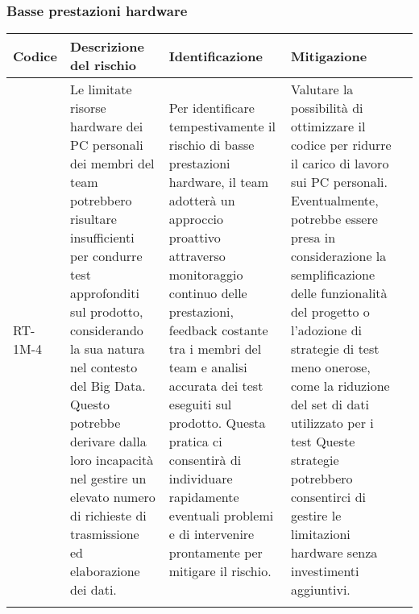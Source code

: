 \subsubsection{Basse prestazioni hardware} \label{sec:lowPrestazioniHW}
\begin{table}[H]
    \centering
    \begin{tabularx}{\textwidth}{l>{\RaggedRight}X>{\RaggedRight}X>{\RaggedRight}X>{\RaggedRight}X}
    \toprule
    \rowcolor{gray!50}
    \textbf{Codice} & \textbf{Descrizione del rischio} & \textbf{Identificazione} & \textbf{Mitigazione} \\
    \midrule
    \addlinespace 
    RT-1M-4 & 
    Le limitate risorse hardware dei PC personali dei membri del team potrebbero risultare insufficienti per condurre test approfonditi sul prodotto, considerando la sua natura nel contesto del Big Data. Questo potrebbe derivare dalla loro incapacità nel gestire un elevato numero di richieste di trasmissione ed elaborazione dei dati. &
    Per identificare tempestivamente il rischio di basse prestazioni hardware, il team adotterà un approccio proattivo attraverso monitoraggio continuo delle prestazioni, feedback costante tra i membri del team e analisi accurata dei test eseguiti sul prodotto. Questa pratica ci consentirà di individuare rapidamente eventuali problemi e di intervenire prontamente per mitigare il rischio. &
    Valutare la possibilità di ottimizzare il codice per ridurre il carico di lavoro sui PC personali. Eventualmente, potrebbe essere presa in considerazione la semplificazione delle funzionalità del progetto o l'adozione di strategie di test meno onerose, come la riduzione del set di dati utilizzato per i test Queste strategie potrebbero consentirci di gestire le limitazioni hardware senza investimenti aggiuntivi. \\
    \bottomrule
    \addlinespace 
    \end{tabularx}
\end{table}


